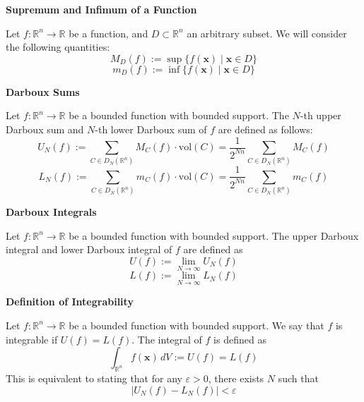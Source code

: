 \documentclass{article}
\newcommand{\R}{\mathbb{R}}
\newenvironment{definition}[1]{
    \par\noindent\textbf{#1}\par\noindent
}{
    \par \vspace{0.5cm}
}
\begin{document}
\begin{definition}{Supremum and Infimum of a Function}
    Let \( f : \R^n \to \R \) be a function, and \( D \subset \R^n \) an arbitrary subset. We will
    consider the following quantities:
    \[ M_D(f) := \sup\{f(\bm{x}) \mid \bm{x} \in D\} \]
    \[ m_D(f) := \inf\{f(\bm{x}) \mid \bm{x} \in D\} \]
\end{definition}


\begin{definition}{Darboux Sums}
    Let \( f : \R^n \to \R \) be a bounded function with bounded support. The \( N \)-th upper Darboux sum and \( N \)-th lower Darboux sum of \( f \) are defined as follows:
    \[ U_N(f) := \sum_{C \in D_N(\R^n)} M_C(f) \cdot \text{vol}(C) = \frac{1}{2^{Nn}} \sum_{C \in D_N(\R^n)} M_C(f) \]
    \[ L_N(f) := \sum_{C \in D_N(\R^n)} m_C(f) \cdot \text{vol}(C) = \frac{1}{2^{Nn}} \sum_{C \in D_N(\R^n)} m_C(f) \]
\end{definition}

\begin{definition}{Darboux Integrals}
    Let \( f : \R^n \to \R \) be a bounded function with bounded support. The upper
    Darboux integral and lower Darboux integral of \( f \) are defined as 
    \[ U(f) := \lim_{N \to \infty} U_N(f) \]
    \[ L(f) := \lim_{N \to \infty} L_N(f) \]
\end{definition}

\begin{definition}{Definition of Integrability}
    Let \( f : \R^n \to \R \) be a bounded function with bounded support. We say that \( f \) is integrable if \( U(f) = L(f) \).
    The integral of \( f \) is defined as
    \[ \int_{\R^n} f(\bm{x}) \, dV := U(f) = L(f) \]
    This is equivalent to stating that for any \( \varepsilon > 0 \), there exists \( N \) such that
    \[ |U_N(f) - L_N(f)| < \varepsilon \]
\end{definition}
\end{document}
